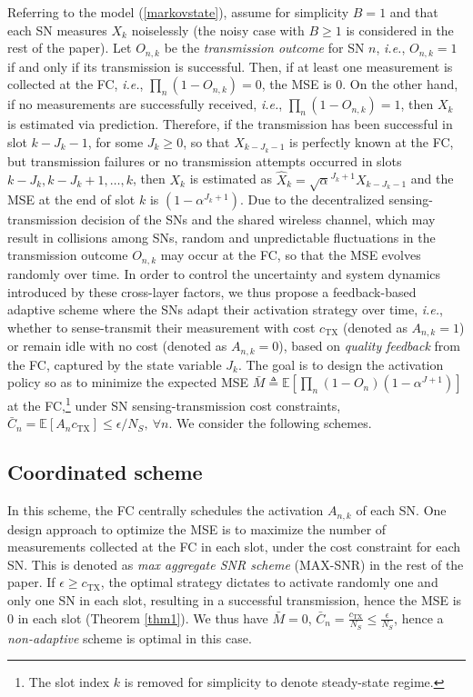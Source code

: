 \documentclass[10pt,twocolumn,twoside]{IEEEtran}
\theoremstyle{plain}
\begin{document}
Referring to the model (\ref{markovstate}),
 assume for simplicity $B{=}1$
 and that each SN measures $X_k$ noiselessly (the noisy case with $B{\geq}1$ is considered in the rest of the paper).
   Let $O_{n,k}$ be the \emph{transmission outcome} for SN $n$, \emph{i.e.}, $O_{n,k}{=}1$ if and only if its transmission is successful. 
    Then, if at least one measurement is collected at the FC, \emph{i.e.}, $\prod_n(1{-}O_{n,k}){=}0$,
 the MSE is $0$. On the other hand, if no measurements are successfully received, \emph{i.e.}, $\prod_n(1{-}O_{n,k}){=}1$, then
$X_k$ is estimated via prediction. Therefore, if the transmission has been successful in slot $k{-}J_k{-}1$, for some $J_k{\geq}0$,
so that $X_{k-J_k-1}$ is perfectly known at the FC,
 but transmission failures or no transmission attempts occurred in slots $k{-}J_k,k{-}J_k{+}1,\dots,k$, then $X_k$ is estimated as $\hat X_k=\sqrt{\alpha}^{J_k+1}X_{k-J_k-1}$ and
 the MSE at the end of slot $k$ is $(1{-}\alpha^{J_k+1})$.
 Due to the decentralized sensing-transmission decision of the SNs and the
  shared wireless channel, which may result in collisions among SNs, random and unpredictable fluctuations in the transmission outcome $O_{n,k}$ may occur at the FC,
  so that the MSE evolves randomly over time. In order to control the uncertainty and system dynamics introduced by these cross-layer factors, we thus propose a
  feedback-based adaptive  scheme where
 the SNs adapt their activation strategy over time, \emph{i.e.}, whether to sense-transmit their measurement with cost $c_{\mathrm{TX}}$ (denoted as $A_{n,k}=1$) or remain idle 
 with no cost (denoted as $A_{n,k}=0$), based on \emph{quality feedback} from the FC, captured by the state variable $J_k$.
 The goal is to design the activation policy so as to minimize the expected MSE
$\bar M\triangleq\mathbb E[\prod_n(1-O_{n})(1-\alpha^{J+1})]$
 at the FC,\footnote{The slot index $k$ is removed for simplicity to denote steady-state regime.}
under SN sensing-transmission cost constraints, $\bar C_n=\mathbb E[A_{n}c_{\mathrm{TX}}]\leq \epsilon/N_S,\ \forall  n$.
We consider the following schemes.
\vspace{-3mm}
\subsection{Coordinated scheme}
\label{coordscheme}
 In this scheme, the FC centrally schedules the activation $A_{n,k}$ of  each SN.
One design approach to optimize the MSE
is to maximize the number of measurements collected at the FC in each slot, under the cost constraint for each SN.
This is denoted as \emph{max aggregate SNR scheme} (MAX-SNR) in the rest of the paper.
If $\epsilon\geq c_{\mathrm{TX}}$, the optimal strategy dictates to activate randomly one and only one SN in each slot,
resulting in a successful transmission, hence the MSE is $0$ in each slot (Theorem \ref{thm1}). We thus have
 $\bar M=0$, $\bar C_n{=}\frac{c_{\mathrm{TX}}}{N_S}{\leq}\frac{\epsilon}{N_S}$, hence
 a \emph{non-adaptive} scheme is optimal in this case.
 \vspace{-3mm}
\end{document}
